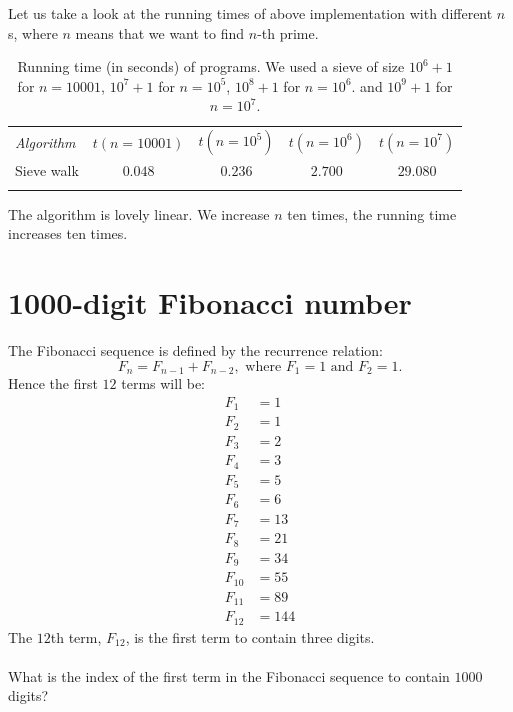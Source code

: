 \documentclass{book}
\newenvironment{task}
  {\begin{mdframed}[backgroundcolor=lightgray]}
  {\end{mdframed}}
\begin{document}
Let us take a look at the running times of above implementation with different $n$s, where $n$ means that we want to find $n$-th prime.

\begin{table}[h!]
\centering
\begin{tabular}{||l||c|c|c|c||}
\hhline{|t:=====:t|}
\textit{Algorithm} & $t(n=10001)$ & $t(n = 10^5)$ & $t(n=10^6)$ & $t(n=10^7)$\\ \hhline{||-||----||}
Sieve walk & $0.048$ & $0.236$ & $2.700$ & $29.080$ \\ \hhline{|b:=====:b|}
\end{tabular}
\caption{Running time (in seconds) of programs. We used a sieve of size $10^6 + 1$ for $n=10001$, $10^7 + 1$ for $n = 10^5$, $10^8 + 1$ for $n = 10^6$. and $10^9 + 1$ for $n = 10^7$.}
\end{table}

The algorithm is lovely linear. We increase $n$ ten times, the running time increases ten times.


\setcounter{section}{24}
\section{1000-digit Fibonacci number}

\begin{task}
The Fibonacci sequence is defined by the recurrence relation:
\[F_n = F_{n-1} + F_{n-2},\textrm{ where $F_1 = 1$ and $F_2 = 1$}.\]
Hence the first $12$ terms will be:
\begin{align*}
F_1 &= 1\\
F_2 &= 1\\
F_3 &= 2\\
F_4 &= 3\\
F_5 &= 5\\
F_6 &= 6\\
F_7 &= 13\\
F_8 &= 21\\
F_9 &= 34\\
F_{10} &= 55\\
F_{11} &= 89\\
F_{12} &= 144
\end{align*}
The $12$th term, $F_{12}$, is the first term to contain three digits.\\
\\
What is the index of the first term in the Fibonacci sequence to contain $1000$ digits?
\end{task}
\end{document}
